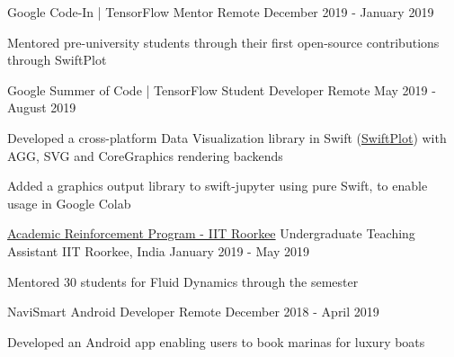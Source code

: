 \begin{cventries}
{\begin{cvitems}
		\end{cvitems} 
	}
\cventry    
	{Google Code-In | TensorFlow}
	{Mentor}
	{Remote}
	{December 2019 - January 2019}
	{
		\begin{cvitems}
			\item{Mentored pre-university students through their first open-source contributions through SwiftPlot}
		\end{cvitems} 
	}
\cventry    
	{Google Summer of Code | TensorFlow}
	{Student Developer}
	{Remote}
	{May 2019 - August 2019}
	{
		\begin{cvitems}
			\item{Developed a cross-platform Data Visualization library in Swift (\href{https://github.com/KarthikRIyer/swiftplot}{SwiftPlot}) with \\AGG, SVG and CoreGraphics rendering backends}
			\item{Added a graphics output library to swift-jupyter using pure Swift, to enable usage in Google Colab}
		\end{cvitems} 
	}
\cventry    
	{\href{http://arp.iitr.ac.in/}{Academic Reinforcement Program - IIT Roorkee}}
	{Undergraduate Teaching Assistant}
	{IIT Roorkee, India}
	{January 2019 - May 2019}
	{
		\begin{cvitems}
			\item{Mentored 30 students for Fluid Dynamics through the semester}
		\end{cvitems} 
	}
\cventrylast
	{NaviSmart}
	{Android Developer}
	{Remote}
	{December 2018 - April 2019}
	{
		\begin{cvitems}
			\item {Developed an Android app enabling users to book marinas for luxury boats}
		\end{cvitems}
	}
\end{cventries}
